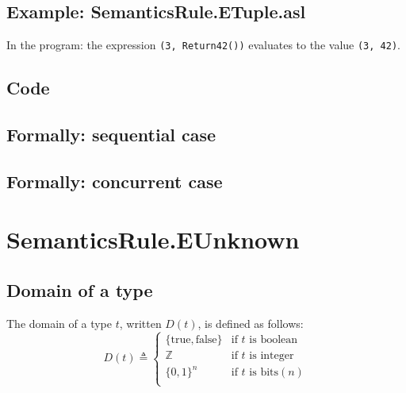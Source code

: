 \documentclass{book}
\begin{document}
  \subsection{Example: SemanticsRule.ETuple.asl}
    In the program:
    the expression \texttt{(3, Return42())} evaluates to the value \texttt{(3, 42)}.

  \subsection{Code}

\begin{emptyformal}
  \subsection{Formally: sequential case}

  \subsection{Formally: concurrent case}
\end{emptyformal}


\section{SemanticsRule.EUnknown \label{sec:SemanticsRule.EUnknown}}

  \subsection{Domain of a type}

  The domain of a type $t$, written $D(t)$, is defined as follows:
  \[
  D(t) \triangleq \left\{
    \begin{array}{ll}
      \{\text{true}, \text{false} \} & \text{if } t \text{ is boolean}  \\
      \mathbb{Z}                     & \text{if } t \text{ is integer}  \\
      {\{0, 1\}}^n                   & \text{if } t \text{ is bits} (n) \\
    \end{array}
  \right.
  \]
\end{document}
